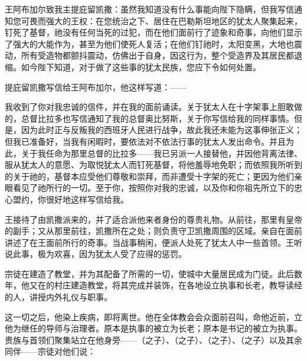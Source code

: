 王阿布加尔致我主提庇留凯撒：虽然我知道没有什么事能向陛下隐瞒，但我写信通知您可畏而强大的王权：在您统治之下、居住在巴勒斯坦地区的犹太人聚集起来，钉死了基督，祂没有任何当死的过犯，而在他们面前行了迹象和奇事，向他们显示了强大的大能作为，甚至为他们使死人复活；在他们钉祂时，太阳变黑，大地也震动，所有受造物都颤抖震动，仿佛出于自身，因这行为，整个受造界及其居民都退缩。如今陛下知道，对于做了这些事的犹太民族，您应下令如何处置。\par

提庇留凯撒写信给王阿布加尔，他这样写道：——\par

我收到了你对我忠诚的信件，并在我的面前诵读。关于犹太人在十字架事上胆敢做的，总督比拉多也写信通知了我的总督奥比努斯，关于你写信给我的同样事情。但是，因为此时正与反叛我的西班牙人民进行战争，故此我还未能为这事伸张正义；但我已准备好，当我有闲暇时，要依法对不依法行事的犹太人发出命令。并且为此，关于我任命为那里总督的比拉多——我已另派一人接替他，并因他背离法律、服从犹太人的意愿、为取悦犹太人而钉死基督，将他羞辱地免职；而依照我所听到的关于祂的，基督本应受他们尊敬和崇拜，而非遭受十字架的死亡；更因为他们亲眼看见了祂所行的一切。至于你，按照你对我的忠诚，以及你和你祖先所立下的忠心盟约，你很好地这样写信给我。\par

王接待了由凯撒派来的，并了适合派他来者身份的尊贵礼物。从前往，那里有皇帝的副手；又从那里前往，凯撒所在之处；则负责守卫凯撒周围的区域。亲自在面前讲述了在王面前所行的奇事。当战事稍闲，便派人处死了犹太人中一些首领。王听说此事，极为欢喜，因为犹太人受了应得的惩罚。\par

宗徒在建造了教堂，并为其配备了所需的一切，使城中大量居民成为门徒。此后数年，他又在的村庄建造教堂，将其完成并装饰，在各地设立执事和长老，教导读经的人，讲授内外礼仪与职事。\par

这一切之后，他染上疾病，即将离世。他在全体教会会众面前召叫，命他近前，立他为继任的导师与治理者。原本是执事的被立为长老；原本是书记的被立为执事。贵族与首领们聚集站立在他身旁——（之子）、（之子）、（之子）、（之子）以及其余同伴——宗徒对他们说：\par

